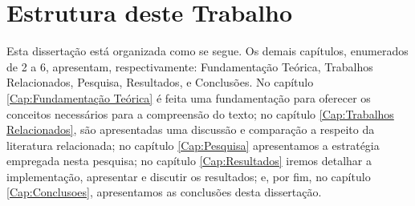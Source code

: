 


\section{Estrutura deste Trabalho}

Esta dissertação está organizada como se segue. Os demais capítulos, enumerados de 2 a 6, apresentam, respectivamente: Fundamentação Teórica, Trabalhos Relacionados, Pesquisa, Resultados, e Conclusões. No capítulo \ref{Cap:Fundamentação Teórica} é feita uma fundamentação para oferecer os conceitos necessários para a compreensão do texto; no capítulo \ref{Cap:Trabalhos Relacionados}, são apresentadas uma discussão e comparação a respeito da literatura relacionada; no capítulo \ref{Cap:Pesquisa} apresentamos a estratégia empregada nesta pesquisa; no capítulo \ref{Cap:Resultados} iremos detalhar a implementação, apresentar e discutir os resultados; e, por fim, no capítulo \ref{Cap:Conclusoes}, apresentamos as conclusões desta dissertação.

